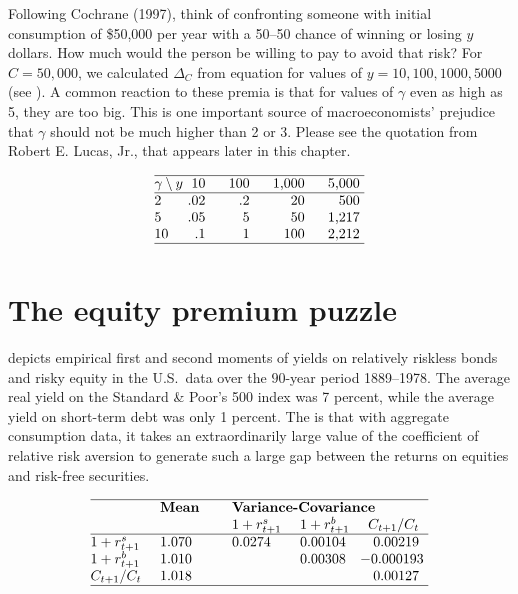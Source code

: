 %
Following Cochrane (1997), think of confronting
someone with initial consumption of \$50,000 per year
 with a  50--50 chance of winning or losing  $y$ dollars.  How much
would the person be willing to pay to avoid that risk?
  For $C=50,000$, we calculated $\Delta_C$ from equation 
for values of $y=10, 100, 1000, 5000$ (see  ).
A common reaction to these premia is that for values
of $\gamma$ even as high as 5, they are too big.   This
is one important source of macroeconomists' prejudice
that $\gamma$ should not be much higher than 2 or 3. Please see the quotation
from Robert E. Lucas, Jr., that appears later in this chapter.
\bigskip
{}

$$\vbox{\offinterlineskip
\hrule
\halign{\strut #\hfil & \hfil# &\quad \hfil# &\quad \hfil#
&\quad \hfil#\cr
$\gamma \setminus y$  &  10  & 100 & 1,000 & 5,000 \cr \noalign{\hrule}
2 & .02 & .2 & 20 & 500 \cr
5 & .05 & 5 & 50 & 1,217 \cr
10 & .1 & 1 & 100 & 2,212 \cr\noalign{\hrule}
}}$$
\caption{Risk premium $\Delta_C(y,C)$ for various
values of $y$ and $\gamma$ when $C = 50,000$.}
\endtable

\section{The equity premium puzzle}\label{sec:equitypremium}%
 depicts empirical  first and second moments  of  yields on relatively riskless bonds and risky equity in the
U.S.\ data over the $90$-year period 1889--1978. The average real yield on the Standard \& Poor's 500 index
was 7 percent, while the average yield on short-term debt was only
1 percent.   The  is that with aggregate consumption data, it takes an extraordinarily large value of
the coefficient of relative risk aversion to generate such a large gap between the returns on equities and risk-free securities.
\medskip
{}

$$\vbox{\offinterlineskip
\hrule
\halign{\strut #\hfil \quad & #\qquad & #\quad & #\quad & \hfil # \cr
& {\bf Mean}  & \multispan3{\bf Variance-Covariance}\cr
&             & $1+r^s_{t+1}$ & $1+r^b_{t+1}$ & $C_{t+1}/C_t$ \cr
\noalign{\hrule}
$1+r^s_{t+1}$ & 1.070 & 0.0274 & 0.00104 &    0.00219 \cr
$1+r^b_{t+1}$ & 1.010 &        & 0.00308 & \llap{$-$}0.000193\cr
$C_{t+1}/C_t$ & 1.018 &        &         &    0.00127 \cr \noalign{\hrule}
}}$$

